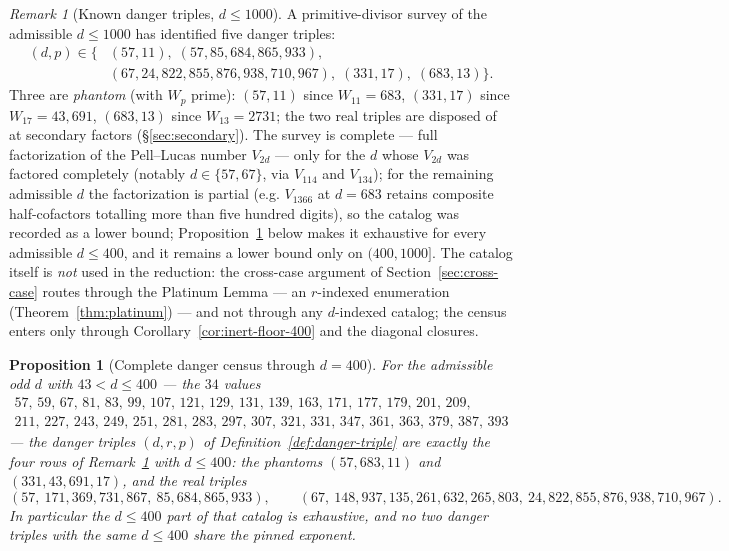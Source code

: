 \documentclass[11pt]{amsart}
\theoremstyle{plain}
\newtheorem{proposition}[theorem]{Proposition}
\theoremstyle{definition}
\theoremstyle{remark}
\newtheorem{remark}[theorem]{Remark}
\numberwithin{equation}{section}
\begin{document}
\begin{remark}[Known danger triples, $d \leq 1000$]\label{rem:known-danger}
A primitive-divisor survey of the admissible $d \leq 1000$ has identified five danger triples:
\[
  \begin{aligned}
  (d, p) \in \{& (57, 11),\; (57, 85{,}684{,}865{,}933),\\
               & (67, 24{,}822{,}855{,}876{,}938{,}710{,}967),\; (331, 17),\; (683, 13)\}.
  \end{aligned}
\]
Three are \emph{phantom} (with $W_p$ prime): $(57, 11)$ since $W_{11} = 683$, $(331, 17)$ since $W_{17} = 43{,}691$, $(683, 13)$ since $W_{13} = 2731$; the two real triples are disposed of at secondary factors (\S\ref{sec:secondary}). The survey is complete --- full factorization of the Pell--Lucas number $V_{2d}$ --- only for the $d$ whose $V_{2d}$ was factored completely (notably $d \in \{57, 67\}$, via $V_{114}$ and $V_{134}$); for the remaining admissible $d$ the factorization is partial (e.g. $V_{1366}$ at $d = 683$ retains composite half-cofactors totalling more than five hundred digits), so the catalog was recorded as a lower bound; Proposition~\ref{prop:danger-census-400} below makes it exhaustive for every admissible $d \leq 400$, and it remains a lower bound only on $(400, 1000]$. The catalog itself is \emph{not} used in the reduction: the cross-case argument of Section~\ref{sec:cross-case} routes through the Platinum Lemma --- an $r$-indexed enumeration (Theorem~\ref{thm:platinum}) --- and not through any $d$-indexed catalog; the census enters only through Corollary~\ref{cor:inert-floor-400} and the diagonal closures.
\end{remark}

\begin{proposition}[Complete danger census through $d = 400$]\label{prop:danger-census-400}
For the admissible odd $d$ with $43 < d \leq 400$ --- the $34$ values
\[
  \begin{gathered}
  57,\, 59,\, 67,\, 81,\, 83,\, 99,\, 107,\, 121,\, 129,\, 131,\, 139,\, 163,\, 171,\, 177,\, 179,\, 201,\, 209,\\
  211,\, 227,\, 243,\, 249,\, 251,\, 281,\, 283,\, 297,\, 307,\, 321,\, 331,\, 347,\, 361,\, 363,\, 379,\, 387,\, 393
  \end{gathered}
\]
--- the danger triples $(d, r, p)$ of Definition~\ref{def:danger-triple} are exactly the four rows of Remark~\ref{rem:known-danger} with $d \leq 400$: the phantoms $(57, 683, 11)$ and $(331, 43{,}691, 17)$, and the real triples
\[
  (57,\ 171{,}369{,}731{,}867,\ 85{,}684{,}865{,}933), \qquad
  (67,\ 148{,}937{,}135{,}261{,}632{,}265{,}803,\ 24{,}822{,}855{,}876{,}938{,}710{,}967).
\]
In particular the $d \leq 400$ part of that catalog is exhaustive, and no two danger triples with the same $d \leq 400$ share the pinned exponent.
\end{proposition}
\end{document}

